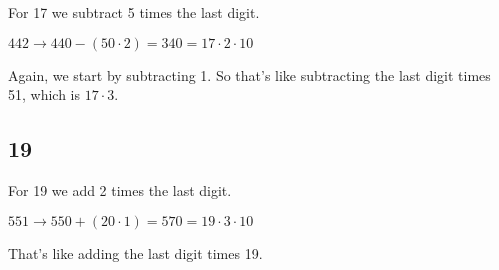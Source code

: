 \documentclass[11pt, oneside]{article}
\begin{document}
For 17 we subtract 5 times the last digit.

$442 \rightarrow 440 - (50 \cdot 2) = 340 = 17 \cdot 2 \cdot 10$

Again, we start by subtracting 1.  So that's like subtracting the last digit times 51, which is $17 \cdot 3$.

\subsection*{19}

For 19 we add 2 times the last digit.

$551 \rightarrow 550 + (20 \cdot 1) = 570 = 19 \cdot 3 \cdot 10$

That's like adding the last digit times 19.
\end{document}

